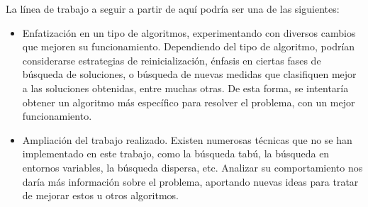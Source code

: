 La línea de trabajo a seguir a partir de aquí podría ser una de las siguientes:
\begin{itemize}
  \item Enfatización en un tipo de algoritmos, experimentando con diversos cambios que
        mejoren su funcionamiento. Dependiendo del tipo de algoritmo, podrían considerarse
        estrategias de reinicialización, énfasis en ciertas fases de búsqueda de soluciones,
        o búsqueda de nuevas medidas que clasifiquen mejor a las soluciones obtenidas, entre
        muchas otras. De esta forma, se intentaría obtener un algoritmo más específico para
        resolver el problema, con un mejor funcionamiento.

  \item Ampliación del trabajo realizado. Existen numerosas técnicas que no se han implementado
        en este trabajo, como la búsqueda tabú, la búsqueda en entornos variables, la búsqueda
        dispersa, etc. Analizar su comportamiento nos daría más información sobre el problema,
        aportando nuevas ideas para tratar de mejorar estos u otros algoritmos.
\end{itemize}





\iffalse

